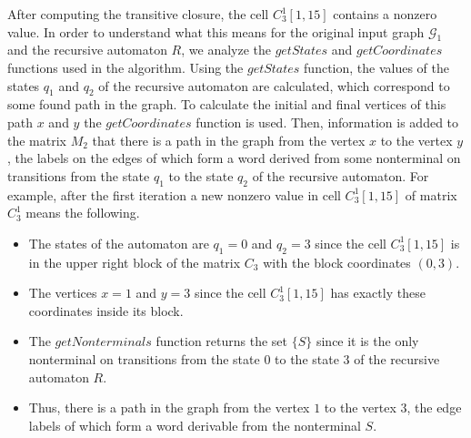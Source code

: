 
After computing the transitive closure, the cell $C_3^1[1, 15]$ contains a nonzero value. In order to understand what this means for the original input graph $\mathcal{G}_1$ and the recursive automaton $R$, we analyze the $\textit{getStates}$ and $\textit{getCoordinates}$ functions used in the algorithm. Using the $\textit{getStates}$ function, the values of the states $q_1$ and $q_2$ of the recursive automaton are calculated, which correspond to some found path in the graph. To calculate the initial and final vertices of this path $x$ and $y$ the $\textit{getCoordinates}$ function is used. Then, information is added to the matrix $M_2$ that there is a path in the graph from the vertex $x$ to the vertex $y$, the labels on the edges of which form a word derived from some nonterminal on transitions from the state $q_1$ to the state $q_2$ of the recursive automaton. For example, after the first iteration a new nonzero value in cell $C_3^1[1, 15]$ of matrix $C_3^1$ means the following.
\begin{itemize}
    \item The states of the automaton are $q_1 = 0$ and $q_2 = 3$ since the cell $C_3^1[1, 15]$ is in the upper right block of the matrix $C_3$ with the block coordinates $(0, 3)$.
    \item The vertices $x = 1$ and $y = 3$ since the cell $C_3^1[1, 15]$ has exactly these coordinates inside its block.
    \item The $\textit{getNonterminals}$ function returns the set $\{S\}$ since it is the only nonterminal on transitions from the state $0$ to the state $3$ of the recursive automaton $R$.
    \item Thus, there is a path in the graph from the vertex $1$ to the vertex $3$, the edge labels of which form a word derivable from the nonterminal $S$.
\end{itemize}


